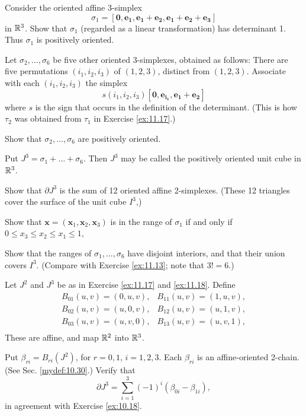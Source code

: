 \begin{myexercise}
    \label{ex:10.18}
    Consider the oriented affine 3-simplex
    \begin{equation*}
        \sigma_1 =  \left[ \mathbf{0,e_1,e_1+e_2,e_1+e_2+e_3} \right]
    \end{equation*}
    in ${\protect\mathbb R}^3$.
    Show that $\sigma_1$
    (regarded as a linear transformation) has determinant 1.
    Thus $\sigma_1$ is positively oriented.

    Let $\sigma_2 , ... , \sigma_6$ be five other oriented 3-simplexes, obtained as follows:
    There are five permutations $(i_1, i_2, i_3)$ of $(1, 2, 3)$, distinct from $(1, 2, 3)$.
    Associate with each $(i_1, i_2, i_3)$ the simplex
    \begin{equation*}
        s(i_1, i_2, i_3) \left[ \mathbf{0,e_{i_1},e_1+e_2} \right]
    \end{equation*}
    where $s$ is the sign that occurs in the definition of the determinant.
    (This is how $\tau_2$ was obtained from $\tau_1$ in Exercise \ref{ex:11.17}.)

    Show that $\sigma_2, \dots , \sigma_6$ are positively oriented.

    Put $J^3 = \sigma_1 + \dots + \sigma_6$.
    Then $J^3$ may be called the positively oriented unit cube in ${\protect\mathbb R}^3$.

    Show that $\partial J^3$ is the sum of 12 oriented affine 2-simplexes.
    (These 12 triangles cover the surface of the unit cube $I^3$,)

    Show that $\mathbf{x} = (\mathbf{x}_1, \mathbf{x}_2, \mathbf{x}_3)$ is in the range of $\sigma_1$ if and only if $0 \leq x_3 \leq x_2 \leq x_1 \leq 1$,

    Show that the ranges of $\sigma_1, ... , \sigma_6$ have disjoint interiors, and that their union covers $I^3$.
    (Compare with Exercise \ref{ex:11.13}; note that $3! = 6$.)
\end{myexercise}


\begin{myexercise}
    \label{ex:10.19}
    Let $J^2$ and $J^3$ be as in Exercise \ref{ex:11.17} and \ref{ex:11.18}.
    Define
    \begin{align*}
        B_{01}(u,v) = (0,u,v), & B_{11}(u,v) = (1,u,v), \\
        B_{02}(u,v) = (u,0,v), & B_{12}(u,v) = (u,1,v), \\
        B_{03}(u,v) = (u,v,0), & B_{13}(u,v) = (u,v,1), \\
    \end{align*}
    These are affine, and map ${\protect\mathbb R}^2$ into ${\protect\mathbb R}^3$.

    Put $\beta_{ri} = B_{ri}(J^2)$, for $r = 0,1$, $i=1,2,3$.
    Each $\beta_{ri}$ is an affine-oriented 2-chain.
    (See Sec. \ref{mydef:10.30}.)
    Verify that
    \begin{equation*}
        \partial J^3 = \sum_{i=1}^{3}(-1)^i (\beta_{0i}-\beta_{1i}),
    \end{equation*}
    in agreement with Exercise \ref{ex:10.18}.
\end{myexercise}



